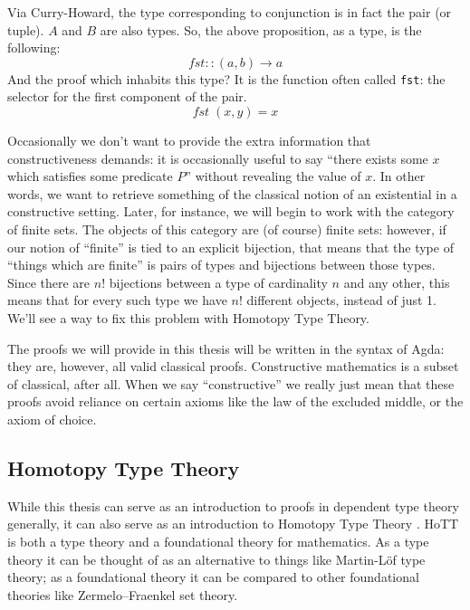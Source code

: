 Via Curry-Howard, the type corresponding to conjunction is in fact the pair (or
tuple).
\(A\) and \(B\) are also types.
So, the above proposition, as a type, is the following:
\begin{equation*}
  \mathit{fst}\mathbin{::}(a,b)\to a
\end{equation*}
And the proof which inhabits this type?
It is the function often called \verb+fst+: the selector for the first component
of the pair.
\begin{equation*}
  \mathit{fst}\;(x,y) = x
\end{equation*}

Occasionally we don't want to provide the extra information that
constructiveness demands: it is occasionally useful to say ``there exists some
\(x\) which satisfies some predicate \(P\)'' without revealing the value of \(x\).
In other words, we want to retrieve something of the classical notion of an
existential in a constructive setting.
Later, for instance, we will begin to work with the
category of finite sets.
The objects of this category are (of course) finite sets: however, if our notion
of ``finite'' is tied to an explicit bijection, that means that the type of
``things which are finite'' is pairs of types and bijections between those
types. 
Since there are \(n!\) bijections between a type of cardinality \(n\) and any
other, this means that for every such type we have \(n!\) different objects,
instead of just 1.
We'll see a way to fix this problem with Homotopy Type Theory.

The proofs we will provide in this thesis will be written in the syntax of
Agda: they are, however, all valid classical proofs.
Constructive mathematics is a subset of classical, after all.
When we say ``constructive'' we really just mean that these proofs avoid
reliance on certain axioms like the law of the excluded middle, or the axiom of
choice.
\subsection{Homotopy Type Theory}
While this thesis can serve as an introduction to proofs in dependent type
theory generally, it can also serve as an introduction to Homotopy Type Theory
\citep{hottbook}.
HoTT is both a type theory and a foundational theory for mathematics.
As a type theory it can be thought of as an alternative to things like
Martin-Löf type theory; as a foundational theory it can be compared to other
foundational theories like Zermelo–Fraenkel set theory.

